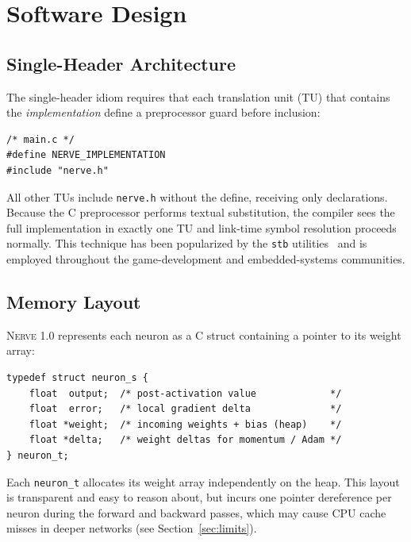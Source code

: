 \documentclass[11pt,a4paper]{article}
\newcommand{\nerve}{\textsc{Nerve}}
\begin{document}
\section{Software Design}
\label{sec:design}

\subsection{Single-Header Architecture}

The single-header idiom requires that each translation unit (TU) that contains
the \emph{implementation} define a preprocessor guard before inclusion:
\begin{lstlisting}[caption={Minimal usage --- implementation in one TU only}]
/* main.c */
#define NERVE_IMPLEMENTATION
#include "nerve.h"
\end{lstlisting}
All other TUs include \texttt{nerve.h} without the define, receiving only
declarations. Because the C preprocessor performs textual substitution,
the compiler sees the full implementation in exactly one TU and link-time
symbol resolution proceeds normally. This technique has been popularized
by the \texttt{stb} utilities~\cite{barrett_stb} and is employed throughout
the game-development and embedded-systems communities.

\subsection{Memory Layout}
\label{sec:memory}

\nerve{} 1.0 represents each neuron as a C struct containing a pointer to
its weight array:
\begin{lstlisting}[caption={Core data structures in \texttt{nerve.h}}]
typedef struct neuron_s {
    float  output;  /* post-activation value             */
    float  error;   /* local gradient delta              */
    float *weight;  /* incoming weights + bias (heap)    */
    float *delta;   /* weight deltas for momentum / Adam */
} neuron_t;
\end{lstlisting}
Each \texttt{neuron\_t} allocates its weight array independently on the
heap. This layout is transparent and easy to reason about, but incurs
one pointer dereference per neuron during the forward and backward passes,
which may cause CPU cache misses in deeper networks (see
Section~\ref{sec:limits}).
\end{document}
